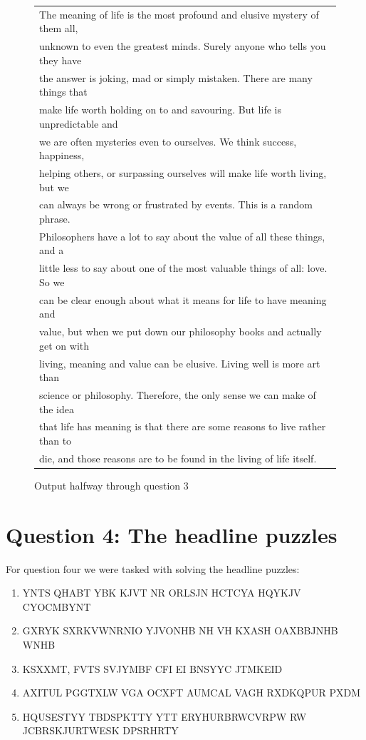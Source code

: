 \documentclass[12pt]{article}
\begin{document}
\begin{figure}[!h]
\label{fig:qThreeOut}
\begin{tabular}{|l|}
 \hline
The meaning of life is the most profound and elusive mystery of them all,\\ unknown to even the greatest minds. Surely anyone who tells you they have\\ the answer is joking, mad or simply mistaken. There are many things that\\ make life worth holding on to and savouring. But life is unpredictable and\\ we are often mysteries even to ourselves. We think success, happiness,\\ helping others, or surpassing ourselves will make life worth living, but we\\ can always be wrong or frustrated by events. This is a random phrase.\\ Philosophers have a lot to say about the value of all these things, and a\\ little less to say about one of the most valuable things of all: love. So we\\ can be clear enough about what it means for life to have meaning and\\ value, but when we put down our philosophy books and actually get on with\\ living, meaning and value can be elusive. Living well is more art than\\ science or philosophy. Therefore,  the only sense we can make of the idea\\ that life has meaning is that there are some reasons to live rather than to\\ die, and those reasons are to be found in the living of life itself.\\
\hline
\end{tabular}
\caption{Output halfway through question 3}
\end{figure}

\section{Question 4: The headline puzzles}

For question four we were tasked with solving the headline puzzles:
\begin{enumerate}
\item YNTS QHABT YBK KJVT NR ORLSJN HCTCYA HQYKJV CYOCMBYNT
\item GXRYK SXRKVWNRNIO YJVONHB NH VH KXASH OAXBBJNHB WNHB
\item KSXXMT, FVTS SVJYMBF CFI EI BNSYYC JTMKEID
\item AXITUL PGGTXLW VGA OCXFT AUMCAL VAGH RXDKQPUR PXDM
\item HQUSESTYY TBDSPKTTY YTT ERYHURBRWCVRPW RW JCBRSKJURTWESK DPSRHRTY
\end{enumerate}
\end{document}
